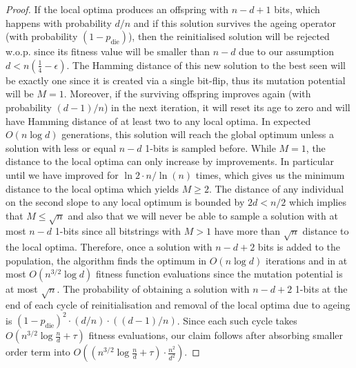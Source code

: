 \documentclass[lettersize,journal]{IEEEtran}
\begin{document}
\begin{proof}
If the local optima produces an offspring with $n-d+1$ bits, which happens  with probability 
$d/n$ and if this solution survives the ageing operator (with 
probability $(1-p_{\text{die}})$), then  the reinitialised solution will be rejected w.o.p. 
since its fitness value will be smaller than $n-d$ due to our assumption $d<n(\frac{1}{4}-\epsilon)$. 
The Hamming distance of this new solution to the best seen will be exactly one 
since it is created via a single bit-flip, thus its mutation potential 
will be $M=1$.  Moreover, if the surviving offspring improves again (with 
probability $(d-1)/n$) in the next iteration, it will reset its age to zero and 
will 
have Hamming distance of at least two to any local optima.  In expected 
$O(n\log d)$ generations, this solution will reach 
the global optimum unless a solution with less or equal $n-d$ 1-bits is sampled 
before. {\color{blue}While $M=1$, the distance to the local optima can only increase by improvements. In particular until we have improved for $\ln{2}\cdot n / \ln(n)$ times, which gives us the minimum distance to the local optima which yields $M\geq 2$. The distance of any individual on the second slope to any local optimum is bounded by $2d<n/2$ which implies that $M\leq \sqrt{n}$ and also that we will never be able to sample a solution with at most $n-d$ 1-bits since all bitstrings with $M>1$ have more than $\sqrt{n}$ distance to the local optima. }  Therefore, 
once a solution with $n-d+2$ bits is added to the population, the algorithm 
finds 
the optimum in {\color{blue}$O(n\log{d})$} iterations and in at 
most {\color{blue} $O(n^{3/2}\log{d})$} fitness function evaluations since the mutation 
potential is at most $\sqrt{n}$. The probability of obtaining a solution with 
$n-d+2$ 1-bits at the end of each cycle of reinitialisation and removal of the 
local optima due to ageing  is $(1-p_{\text{die}})^2 \cdot (d/n)\cdot ((d-1)/n)$. Since each such cycle 
takes {\color{blue}$O(n^{3/2}\log{\frac{n}{d}}+\tau )$} fitness evaluations, our claim follows after absorbing smaller order term into $O\left(\left(n^{3/2}\log{\frac{n}{d}}+\tau\right)\cdot \frac{n^2}{d^2} \right)$.
\end{proof}
\end{document}

